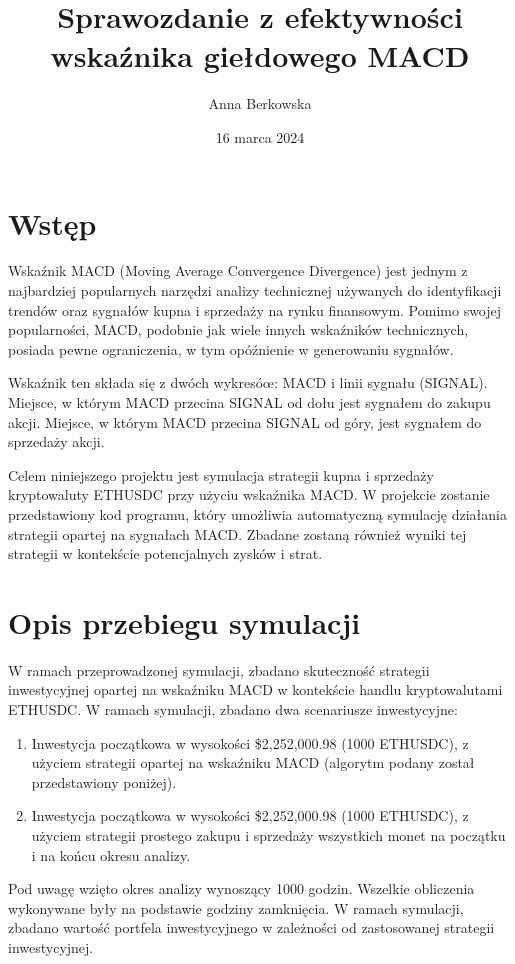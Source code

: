 \documentclass{article}
\title{Sprawozdanie z efektywności wskaźnika giełdowego MACD}
\author{Anna Berkowska}
\date{16 marca 2024}
\begin{document}
    \maketitle
    \section*{Wstęp}

    Wskaźnik MACD (Moving Average Convergence Divergence) jest jednym z najbardziej popularnych narzędzi analizy technicznej używanych do identyfikacji trendów oraz sygnałów kupna i sprzedaży na rynku finansowym. Pomimo swojej popularności, MACD, podobnie jak wiele innych wskaźników technicznych, posiada pewne ograniczenia, w tym opóźnienie w generowaniu sygnałów.

    Wskaźnik ten składa się z dwóch wykresóœ: MACD i linii sygnału (SIGNAL). Miejsce, w którym MACD przecina SIGNAL od dołu jest sygnałem do zakupu akcji. Miejsce, w którym MACD przecina SIGNAL od góry, jest sygnałem do sprzedaży akcji.

    Celem niniejszego projektu jest symulacja strategii kupna i sprzedaży kryptowaluty ETHUSDC przy użyciu wskaźnika MACD. W projekcie zostanie przedstawiony kod programu, który umożliwia automatyczną symulację działania strategii opartej na sygnałach MACD. Zbadane zostaną również wyniki tej strategii w kontekście potencjalnych zysków i strat.

    \section*{Opis przebiegu symulacji}

    W ramach przeprowadzonej symulacji, zbadano skuteczność strategii inwestycyjnej opartej na wskaźniku MACD w kontekście handlu kryptowalutami ETHUSDC. W ramach symulacji, zbadano dwa scenariusze inwestycyjne:

    \begin{enumerate}
        \item Inwestycja początkowa w wysokości \$2,252,000.98 (1000 ETHUSDC), z użyciem strategii opartej na wskaźniku MACD (algorytm podany został przedstawiony poniżej).
        \item Inwestycja początkowa w wysokości \$2,252,000.98 (1000 ETHUSDC), z użyciem strategii prostego zakupu i sprzedaży wszystkich monet na początku i na końcu okresu analizy.
    \end{enumerate}

    Pod uwagę wzięto okres analizy wynoszący 1000 godzin. Wszelkie obliczenia wykonywane były na podstawie godziny zamknięcia. W ramach symulacji, zbadano wartość portfela inwestycyjnego w zależności od zastosowanej strategii inwestycyjnej.
\end{document}
